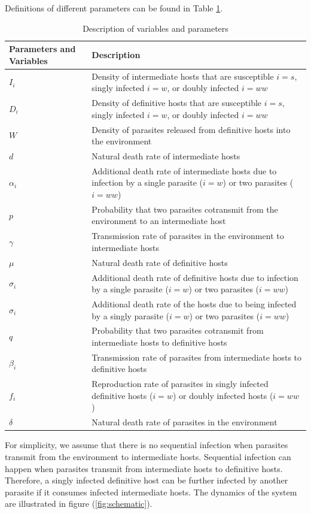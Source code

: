 \documentclass[11pt]{article}
\begin{document}
Definitions of different parameters can be found in Table \ref{table:varpardescription}.
%
\begin{table}[!ht]
\begin{tabular}{|p{2.5cm}|p{12cm}|} 
\hline
Parameters and Variables    &  Description  \\
\hline
$I_i$  & Density of intermediate hosts that are susceptible $i=s$, singly infected $i=w$, or doubly infected $i=ww$ \\
\hline
$D_i$ & Density of definitive hosts that are susceptible $i=s$, singly infected $i=w$, or doubly infected $i=ww$ \\
\hline
$W$ & Density of parasites released from definitive hosts into the environment \\
\hline
$d$ & Natural death rate of intermediate hosts \\
\hline
$\alpha_i$ & Additional death rate of intermediate hosts due to infection by a single parasite ($i = w$) or two parasites ($i = ww$) \\
\hline
$p$ & Probability that two parasites cotransmit from the environment to an intermediate host \\
\hline
$\gamma$ & Transmission rate of parasites in the environment to intermediate hosts \\
\hline
$\mu$ & Natural death rate of definitive hosts \\
\hline
$\sigma_i$ & Additional death rate of definitive hosts due to infection by a single parasite ($i = w$) or two parasites ($i = ww$) \\
\hline
$\sigma_i$ & Additional death rate of the hosts due to being infected by a singly parasite ($i = w$) or two parasites ($i = ww$) \\
\hline
$q$ & Probability that two parasites cotransmit from intermediate hosts to definitive hosts \\
\hline
$\beta_i$ & Transmission rate of parasites from intermediate hosts to definitive hosts \\
\hline
$f_i$ & Reproduction rate of parasites in singly infected definitive hosts ($i = w$) or doubly infected hosts ($i = ww$)\\
\hline
$\delta$ & Natural death rate of parasites in the environment \\
\hline
\end{tabular}
\caption{Description of variables and parameters}
\label{table:varpardescription}
\end{table}

For simplicity, we assume that there is no sequential infection when parasites transmit from the environment to intermediate hosts. 
Sequential infection can happen when parasites transmit from intermediate hosts to definitive hosts. 
Therefore, a singly infected definitive host can be further infected by another parasite if it consumes infected intermediate hosts. 
The dynamics of the system are illustrated in figure (\ref{fig:schematic}).
\end{document}
